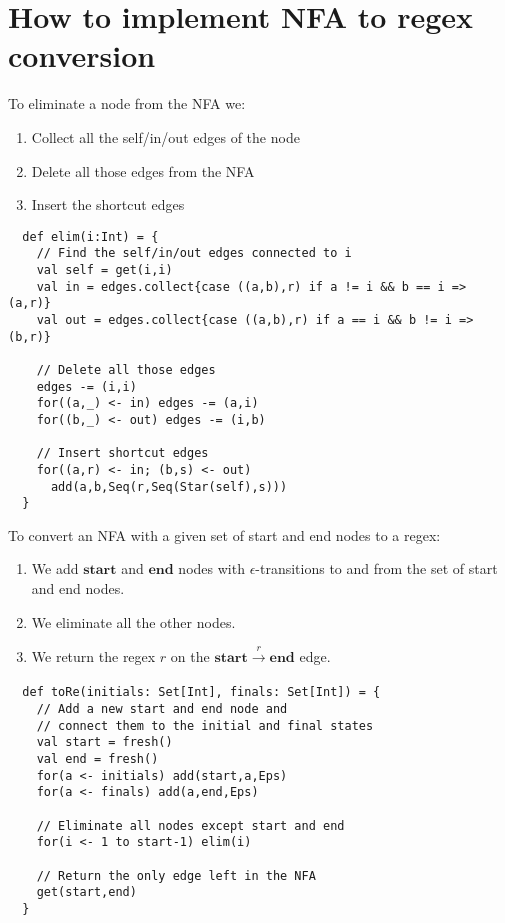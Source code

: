 \documentclass[a4paper, 11pt]{article}
\theoremstyle{definition}
\begin{document}
\section{How to implement NFA to regex conversion}

To eliminate a node from the NFA we:
\begin{enumerate}
  \item Collect all the self/in/out edges of the node
  \item Delete all those edges from the NFA
  \item Insert the shortcut edges
\end{enumerate}
\bigskip

\begin{lstlisting}
  def elim(i:Int) = {
    // Find the self/in/out edges connected to i
    val self = get(i,i)
    val in = edges.collect{case ((a,b),r) if a != i && b == i => (a,r)}
    val out = edges.collect{case ((a,b),r) if a == i && b != i => (b,r)}

    // Delete all those edges
    edges -= (i,i)
    for((a,_) <- in) edges -= (a,i)
    for((b,_) <- out) edges -= (i,b)

    // Insert shortcut edges
    for((a,r) <- in; (b,s) <- out)
      add(a,b,Seq(r,Seq(Star(self),s)))
  }
\end{lstlisting}
\bigskip

\noindent To convert an NFA with a given set of start and end nodes to a regex:
\begin{enumerate}
  \item We add $\mathbf{start}$ and $\mathbf{end}$ nodes with $\epsilon$-transitions to and from the set of start and end nodes.
  \item We eliminate all the other nodes.
  \item We return the regex $r$ on the $\mathbf{start} \xrightarrow[]{r} \mathbf{end}$ edge.
\end{enumerate}
\bigskip

\begin{lstlisting}
  def toRe(initials: Set[Int], finals: Set[Int]) = {
    // Add a new start and end node and
    // connect them to the initial and final states
    val start = fresh()
    val end = fresh()
    for(a <- initials) add(start,a,Eps)
    for(a <- finals) add(a,end,Eps)

    // Eliminate all nodes except start and end
    for(i <- 1 to start-1) elim(i)

    // Return the only edge left in the NFA
    get(start,end)
  }
\end{lstlisting}
\bigskip
\end{document}
